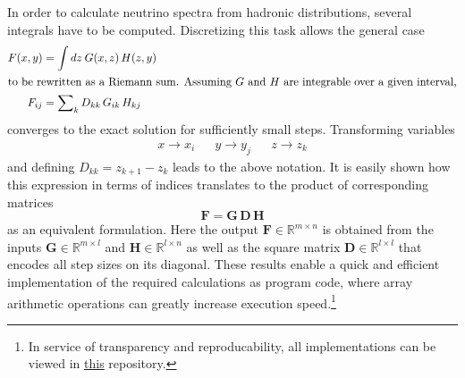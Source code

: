 In order to calculate neutrino spectra from hadronic distributions, several integrals have to be computed. Discretizing
this task allows the general case
\begin{align*}
	F(x, y) &= \int dz \: G(x, z) \, H(z, y) \\
	\intertext{to be rewritten as a Riemann sum. Assuming $G$ and $H$ are integrable over a given interval,}
	F_{ij} &= \sum\nolimits_k D_{kk} \, G_{ik} \, H_{kj}
\end{align*}
converges to the exact solution for sufficiently small steps. Transforming variables
\begin{align*}
	&&&& x \rightarrow x_i && y \rightarrow y_j && z \rightarrow z_k &&&&
\end{align*}
and defining $D_{kk} = z_{k+1} - z_k$ leads to the above notation. It is easily shown how this expression in terms of
indices translates to the product of corresponding matrices
\begin{equation*}
	\bm{F} = \bm{G} \, \bm{D} \, \bm{H}
\end{equation*}
as an equivalent formulation. Here the output $\bm{F} \in \mathbb{R}^{m \times n}$ is obtained from the inputs
$\bm{G} \in \mathbb{R}^{m \times l}$ and $\bm{H} \in \mathbb{R}^{l \times n}$ as well as the square matrix
$\bm{D} \in \mathbb{R}^{l \times l}$ that encodes all step sizes on its diagonal. These results enable a quick and
efficient implementation of the required calculations as program code, where array arithmetic operations can greatly
increase execution speed.\footnote{In service of transparency and reproducability, all implementations can be viewed
in \href{https://github.com/fritzali/bachelor}{this} repository.}
